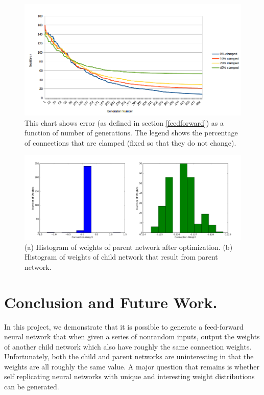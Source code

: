 \documentclass[12pt]{article}
\begin{document}
\begin{figure}[h]
\begin{center}
  \includegraphics[width=1.0\linewidth]{result1.png}
\end{center}
   \caption{This chart shows error (as defined in section \ref{feedforward}) as a function of number of generations. The legend shows the percentage of connections that are clamped (fixed so that they do not change).}
\label{result1}
\end{figure}

\begin{figure}[h]
\begin{center}
  \includegraphics[width=1.0\linewidth]{histogram.png}
\end{center}
   \caption{(a) Histogram of weights of parent network after optimization. (b) Histogram of weights of child network that result from parent network.}
\label{histogram}
\end{figure}

\section{Conclusion and Future Work.}
\label{conclusion}

In this project, we demonstrate that it is possible to generate
a feed-forward neural network that when given a series of nonrandom inputs,
output the weights of another child network which also
have roughly the same connection weights. Unfortunately, both the
child and parent networks are uninteresting in that the weights are all roughly
the same value. A major question that remains is whether self replicating neural 
networks with unique and interesting weight distributions can be generated.
\end{document}

